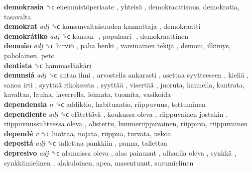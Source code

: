 \textbf{demokrasia} ␝ϲ   enemmistöperiaate ,  yhteisö , demokraattisuus, demokratia, tasavalta  \\
\textbf{demokrat} \emph{adj}  ␝ϲ   kansanvaltaisuuden kannattaja , demokraatti  \\
\textbf{demokrátiko} \emph{adj}  ␝ϲ   kansan- ,  populaari- , demokraattinen  \\
\textbf{demoño} \emph{adj}  ␝ϲ   hirviö ,  paha henki ,  varsinainen tekijä , demoni, ilkimys, paholainen, peto  \\
\textbf{dentista} ␝ϲ   hammaslääkäri   \\
\textbf{denunsiá} \emph{adj}  ␝ϲ   antaa ilmi ,  arvostella ankarasti ,  asettaa syytteeseen ,  kieliä ,  sanoa irti ,  syyttää rikoksesta ,  syyttää ,  visertää , juoruta, kannella, kantrata, kavaltaa, laulaa, laverrella, leimata, tuomita, vasikoida  \\
\textbf{dependensia} \emph{n}  ␝ϲ  addiktio, habituaatio, riippuvuus, tottuminen  \\
\textbf{dependiente} \emph{adj}  ␝ϲ   elätettävä ,  koukussa oleva ,  riippuvainen jostakin ,  riippuvuussuhteessa oleva , alistettu, huumeriippuvainen, riippuva, riippuvainen  \\
\textbf{dependé} \emph{v}  ␝ϲ  luottaa, nojata, riippua, turvata, uskoa  \\
\textbf{depositá} \emph{adj}  ␝ϲ   tallettaa pankkiin , panna, tallettaa  \\
\textbf{depresivo} \emph{adj}  ␝ϲ   alamaissa oleva ,  alas painunut ,  alhaalla oleva ,  synkkä ,  synkkämielinen , alakuloinen, apea, masentunut, surumielinen  \\
